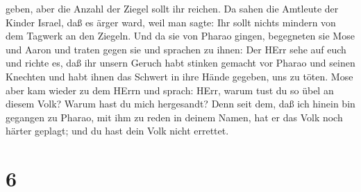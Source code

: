 geben, aber die Anzahl der Ziegel sollt ihr reichen.  Da
sahen die Amtleute der Kinder Israel, daß es ärger ward, weil man sagte:
Ihr sollt nichts mindern von dem Tagwerk an den Ziegeln. 
Und da sie von Pharao gingen, begegneten sie Mose und Aaron und traten
gegen sie  und sprachen zu ihnen: Der HErr sehe auf euch
und richte es, daß ihr unsern Geruch habt stinken gemacht vor Pharao und
seinen Knechten und habt ihnen das Schwert in ihre Hände gegeben, uns zu
töten.  Mose aber kam wieder zu dem HErrn und sprach: HErr,
warum tust du so übel an diesem Volk? Warum hast du mich hergesandt?
 Denn seit dem, daß ich hinein bin gegangen zu Pharao, mit
ihm zu reden in deinem Namen, hat er das Volk noch härter geplagt; und
du hast dein Volk nicht errettet.

\hypertarget{section-5}{%
\section{6}\label{section-5}}

